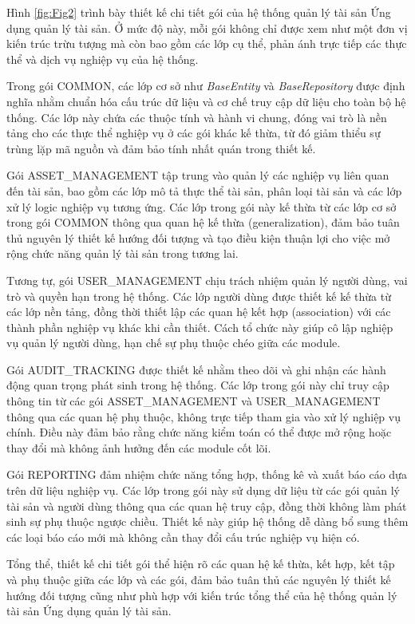 \documentclass[../DoAn.tex]{subfiles}
\begin{document}
Hình \ref{fig:Fig2} trình bày thiết kế chi tiết gói của hệ thống quản lý tài sản Ứng dụng quản lý tài sản. Ở mức độ này, mỗi gói không chỉ được xem như một đơn vị kiến trúc trừu tượng mà còn bao gồm các lớp cụ thể, phản ánh trực tiếp các thực thể và dịch vụ nghiệp vụ của hệ thống.

Trong gói COMMON, các lớp cơ sở như \textit{BaseEntity} và \textit{BaseRepository} được định nghĩa nhằm chuẩn hóa cấu trúc dữ liệu và cơ chế truy cập dữ liệu cho toàn bộ hệ thống. Các lớp này chứa các thuộc tính và hành vi chung, đóng vai trò là nền tảng cho các thực thể nghiệp vụ ở các gói khác kế thừa, từ đó giảm thiểu sự trùng lặp mã nguồn và đảm bảo tính nhất quán trong thiết kế.

Gói ASSET\_MANAGEMENT tập trung vào quản lý các nghiệp vụ liên quan đến tài sản, bao gồm các lớp mô tả thực thể tài sản, phân loại tài sản và các lớp xử lý logic nghiệp vụ tương ứng. Các lớp trong gói này kế thừa từ các lớp cơ sở trong gói COMMON thông qua quan hệ kế thừa (generalization), đảm bảo tuân thủ nguyên lý thiết kế hướng đối tượng và tạo điều kiện thuận lợi cho việc mở rộng chức năng quản lý tài sản trong tương lai.

Tương tự, gói USER\_MANAGEMENT chịu trách nhiệm quản lý người dùng, vai trò và quyền hạn trong hệ thống. Các lớp người dùng được thiết kế kế thừa từ các lớp nền tảng, đồng thời thiết lập các quan hệ kết hợp (association) với các thành phần nghiệp vụ khác khi cần thiết. Cách tổ chức này giúp cô lập nghiệp vụ quản lý người dùng, hạn chế sự phụ thuộc chéo giữa các module.

Gói AUDIT\_TRACKING được thiết kế nhằm theo dõi và ghi nhận các hành động quan trọng phát sinh trong hệ thống. Các lớp trong gói này chỉ truy cập thông tin từ các gói ASSET\_MANAGEMENT và USER\_MANAGEMENT thông qua các quan hệ phụ thuộc, không trực tiếp tham gia vào xử lý nghiệp vụ chính. Điều này đảm bảo rằng chức năng kiểm toán có thể được mở rộng hoặc thay đổi mà không ảnh hưởng đến các module cốt lõi.

Gói REPORTING đảm nhiệm chức năng tổng hợp, thống kê và xuất báo cáo dựa trên dữ liệu nghiệp vụ. Các lớp trong gói này sử dụng dữ liệu từ các gói quản lý tài sản và người dùng thông qua các quan hệ truy cập, đồng thời không làm phát sinh sự phụ thuộc ngược chiều. Thiết kế này giúp hệ thống dễ dàng bổ sung thêm các loại báo cáo mới mà không cần thay đổi cấu trúc nghiệp vụ hiện có.

Tổng thể, thiết kế chi tiết gói thể hiện rõ các quan hệ kế thừa, kết hợp, kết tập và phụ thuộc giữa các lớp và các gói, đảm bảo tuân thủ các nguyên lý thiết kế hướng đối tượng cũng như phù hợp với kiến trúc tổng thể của hệ thống quản lý tài sản Ứng dụng quản lý tài sản.
\end{document}

